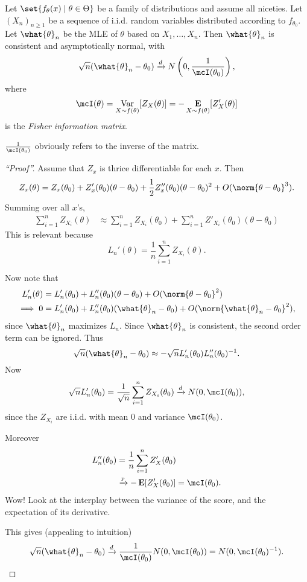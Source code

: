 \begin{theorem*} \label{thm:mle:normality}
    Let $\set{f_\theta(x) \mid \theta \in \Theta}$ be a family of
    distributions and assume all niceties.
    Let $(X_n)_{n \ge 1}$ be a sequence of i.i.d. random variables
    distributed according to $f_{\theta_0}$.
    Let $\what{\theta}_n$ be the MLE of $\theta$ based on $X_1, \ldots, X_n$.
    Then $\what{\theta}_n$ is consistent and asymptotically normal, with \[
        \sqrt{n}(\what{\theta}_n - \theta_0) \dto
            N\left(0, \frac{1}{\mcI(\theta_0)}\right),
    \] where \[
        \mcI(\theta) = \Var_{X \sim f(\theta)}[Z_X(\theta)]
             = -\E_{X \sim f(\theta)}[Z'_X(\theta)]
    \] is the \emph{Fisher information matrix}.
\end{theorem*}
$\frac1{\mcI(\theta_0)}$ obviously refers to the inverse of the matrix.
\begin{proof}[``Proof'']
    Assume that $Z_x$ is thrice differentiable for each $x$.
    Then \[
        Z_x(\theta) = Z_x(\theta_0) + Z'_x(\theta_0)(\theta - \theta_0)
            + \frac12 Z''_x(\theta_0)(\theta - \theta_0)^2
            + O(\norm{\theta - \theta_0}^3).
    \] Summing over all $x$'s, \begin{align*}
        \sum_{i=1}^n Z_{X_i}(\theta)
            &\approx \sum_{i=1}^n Z_{X_i}(\theta_0)
                + \sum_{i=1}^n Z'_{X_i}(\theta_0)(\theta - \theta_0)
    \end{align*}
    This is relevant because \[
        L_n'(\theta) = \frac1n \sum_{i=1}^n Z_{X_i}(\theta).
    \]

    Now note that \begin{align*}
        L_n'(\theta) &= L_n'(\theta_0) + L_n''(\theta_0)(\theta - \theta_0)
                    + O(\norm{\theta - \theta_0}^2) \\
        \implies 0 &= L_n'(\theta_0) + L_n''(\theta_0)(\what{\theta}_n - \theta_0)
                    + O(\norm{\what{\theta}_n - \theta_0}^2),
    \end{align*} since $\what{\theta}_n$ maximizes $L_n$.
    Since $\what{\theta}_n$ is consistent, the second order term can
    be ignored.
    Thus \[
        \sqrt n (\what{\theta}_n - \theta_0) \approx
            - \sqrt n L_n'(\theta_0) L_n''(\theta_0)^{-1}.
    \] Now \[
        \sqrt n L_n'(\theta_0)
        = \frac1{\sqrt n} \sum_{i=1}^n Z_{X_i}(\theta_0)
        \dto N(0, \mcI(\theta_0)),
    \] since the $Z_{X_i}$ are i.i.d. with mean $0$ and variance
    $\mcI(\theta_0)$.

    Moreover \begin{align*}
        L_n''(\theta_0)
            &= \frac1n \sum_{i=1}^n Z'_X(\theta_0) \\
            &\pto -\E[Z'_X(\theta_0)] = \mcI(\theta_0).
    \end{align*}
    Wow! Look at the interplay between the variance of the score, and the
    expectation of its derivative.

    This gives (appealing to intuition) \[
        \sqrt n (\what{\theta}_n - \theta_0)
            \dto \frac1{\mcI(\theta_0)} N(0, \mcI(\theta_0))
            = N(0, \mcI(\theta_0)^{-1}). \qedhere
    \]
\end{proof}

